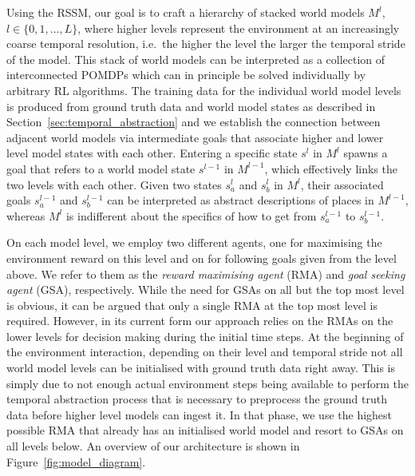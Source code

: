 \documentclass{article}
\begin{document}
Using the RSSM, our goal is to craft a hierarchy of stacked world models $M^l$, $l \in \{0, 1, ..., L\}$, where higher levels represent the environment at an increasingly coarse temporal resolution, i.e.\ the higher the level the larger the temporal stride of the model. This stack of world models can be interpreted as a collection of interconnected POMDPs which can in principle be solved individually by arbitrary RL algorithms. The training data for the individual world model levels is produced from ground truth data and world model states as described in Section~\ref{sec:temporal_abstraction} and we establish the connection between adjacent world models via intermediate goals that associate higher and lower level model states with each other. Entering a specific state $s^l$ in $M^l$ spawns a goal that refers to a world model state $s^{l-1}$ in $M^{l-1}$, which effectively links the two levels with each other. Given two states $s_a^l$ and $s_b^l$ in $M^l$, their associated goals $s_a^{l-1}$ and $s_b^{l-1}$ can be interpreted as abstract descriptions of places in $M^{l-1}$, whereas $M^l$ is indifferent about the specifics of how to get from $s_a^{l-1}$ to $s_b^{l-1}$.

On each model level, we employ two different agents, one for maximising the environment reward on this level and on for following goals given from the level above. We refer to them as the \textit{reward maximising agent} (RMA) and \textit{goal seeking agent} (GSA), respectively. While the need for GSAs on all but the top most level is obvious, it can be argued that only a single RMA at the top most level is required. However, in its current form our approach relies on the RMAs on the lower levels for decision making during the initial time steps. At the beginning of the environment interaction, depending on their level and temporal stride not all world model levels can be initialised with ground truth data right away. This is simply due to not enough actual environment steps being available to perform the temporal abstraction process that is necessary to preprocess the ground truth data before higher level models can ingest it. In that phase, we use the highest possible RMA that already has an initialised world model and resort to GSAs on all levels below. An overview of our architecture is shown in Figure~\ref{fig:model_diagram}.
\end{document}
